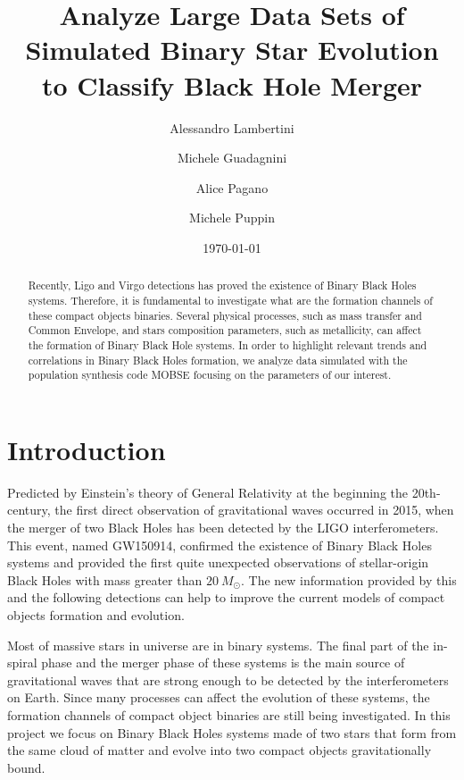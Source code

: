 \documentclass[prb,twocolumn,9pt]{revtex4-1}
\begin{document}
\title{Analyze Large Data Sets of Simulated Binary Star Evolution \\ to Classify Black Hole Merger}

\author{Alessandro Lambertini}
\author{Michele Guadagnini}
\author{Alice Pagano}
\author{Michele Puppin}


\date{\today}

\begin{abstract}
Recently, Ligo and Virgo detections has proved the existence of Binary Black Holes systems. Therefore, it is fundamental to investigate what are the formation channels of these compact objects binaries. Several physical processes, such as mass transfer and Common Envelope, and stars composition parameters, such as metallicity, can affect the formation of Binary Black Hole systems. 
In order to highlight relevant trends and correlations in Binary Black Holes formation, we analyze data simulated with the population synthesis code MOBSE \cite{2018MNRAS.474.2959G} focusing on the parameters of our interest.  
\end{abstract}

\maketitle

\section{Introduction}
Predicted by Einstein's theory of General Relativity at the beginning the 20th-century, the first direct observation of gravitational waves occurred in 2015, when the merger of two Black Holes has been detected by the LIGO interferometers. 
This event, named GW150914, confirmed the existence of Binary Black Holes systems and provided the first quite unexpected observations of stellar-origin Black Holes with mass greater than \(\SI{20}{M_\odot}\). 
The new information provided by this and the following detections can help to improve the current models of compact objects formation and evolution.

Most of massive stars in universe are in binary systems. The final part of the in-spiral phase and the merger phase of these systems is the main source of gravitational waves that are strong enough to be detected by the interferometers on Earth.
Since many processes can affect the evolution of these systems, the formation channels of compact object binaries are still being investigated. 
In this project we focus on Binary Black Holes systems made of two stars that form from the same cloud of matter and evolve into two compact objects gravitationally bound.
\end{document}
